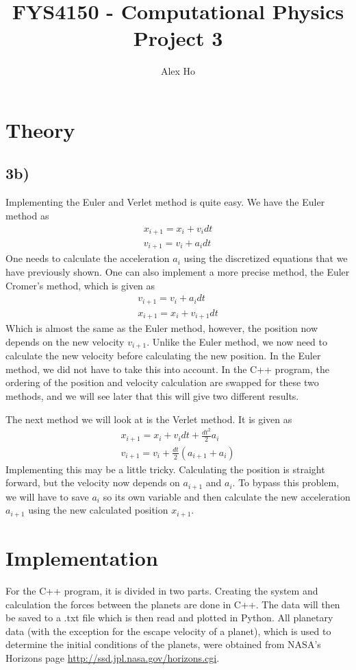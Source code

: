 \documentclass[12pt]{article}
\author{Alex Ho}
\title{FYS4150 - Computational Physics \\ Project 3}
\begin{document}
\maketitle
\section*{Theory}
\subsection*{3b)}
Implementing the Euler and Verlet method is quite easy. We have the Euler method as
\begin{align*}
x_{i+1} = x_i + v_idt \\
v_{i+1} = v_i + a_idt
\end{align*}
One needs to calculate the acceleration $a_i$ using the discretized equations that we have previously shown. One can also implement a more precise method, the Euler Cromer's method, which is given as
\begin{align*}
v_{i+1} = v_i + a_idt \\
x_{i+1} = x_i + v_{i+1}dt
\end{align*}
Which is almost the same as the Euler method, however, the position now depends on the new velocity $v_{i+1}$. Unlike the Euler method, we now need to calculate the new velocity before calculating the new position. In the Euler method, we did not have to take this into account. In the C++ program, the ordering of the position and velocity calculation are swapped for these two methods, and we will see later that this will give two different results.

The next method we will look at is the Verlet method. It is given as
\begin{align*}
x_{i+1} = x_i + v_idt + \frac{dt^2}{2}a_i\\
v_{i+1} = v_i + \frac{dt}{2}\left(a_{i+1} + a_i \right)
\end{align*}
Implementing this may be a little tricky. Calculating the position is straight forward, but the velocity now depends on $a_{i+1}$ and $a_i$. To bypass this problem, we will have to save $a_i$ so its own variable and then calculate the new acceleration $a_{i+1}$ using the new calculated position $x_{i+1}$. 


\section*{Implementation}
For the C++ program, it is divided in two parts. Creating the system and calculation the forces between the planets are done in C++. The data will then be saved to a .txt file which is then read and plotted in Python. All planetary data (with the exception for the escape velocity of a planet), which is used to determine the initial conditions of the planets, were obtained from NASA's Horizons page \url{http://ssd.jpl.nasa.gov/horizons.cgi}. 
\end{document}
